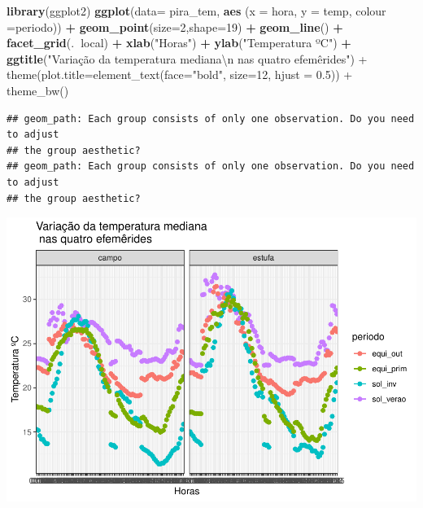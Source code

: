 \documentclass[
]{book}
\newenvironment{Shaded}{\begin{snugshade}}{\end{snugshade}}
\newcommand{\CharTok}[1]{\textcolor[rgb]{0.31,0.60,0.02}{#1}}
\newcommand{\DataTypeTok}[1]{\textcolor[rgb]{0.13,0.29,0.53}{#1}}
\newcommand{\DecValTok}[1]{\textcolor[rgb]{0.00,0.00,0.81}{#1}}
\newcommand{\KeywordTok}[1]{\textcolor[rgb]{0.13,0.29,0.53}{\textbf{#1}}}
\newcommand{\NormalTok}[1]{#1}
\newcommand{\OperatorTok}[1]{\textcolor[rgb]{0.81,0.36,0.00}{\textbf{#1}}}
\newcommand{\StringTok}[1]{\textcolor[rgb]{0.31,0.60,0.02}{#1}}
\begin{document}
\begin{Shaded}
\begin{Highlighting}[]
\KeywordTok{library}\NormalTok{(ggplot2)}
\KeywordTok{ggplot}\NormalTok{(}\DataTypeTok{data=}\NormalTok{ pira_tem, }\KeywordTok{aes}\NormalTok{ (}\DataTypeTok{x =}\NormalTok{ hora, }\DataTypeTok{y =}\NormalTok{ temp, }\DataTypeTok{colour =}\NormalTok{periodo)) }\OperatorTok{+}
\StringTok{  }\KeywordTok{geom_point}\NormalTok{(}\DataTypeTok{size=}\DecValTok{2}\NormalTok{,}\DataTypeTok{shape=}\DecValTok{19}\NormalTok{) }\OperatorTok{+}
\StringTok{  }\KeywordTok{geom_line}\NormalTok{() }\OperatorTok{+}
\StringTok{  }\KeywordTok{facet_grid}\NormalTok{(.}\OperatorTok{~}\NormalTok{local) }\OperatorTok{+}
\StringTok{  }\KeywordTok{xlab}\NormalTok{(}\StringTok{"Horas"}\NormalTok{) }\OperatorTok{+}
\StringTok{  }\KeywordTok{ylab}\NormalTok{(}\StringTok{"Temperatura ºC"}\NormalTok{) }\OperatorTok{+}\StringTok{ }
\StringTok{             }\KeywordTok{ggtitle}\NormalTok{(}\StringTok{"Variação da temperatura mediana}\CharTok{\textbackslash{}n}\StringTok{ nas quatro efemêrides") +}
\StringTok{             theme(plot.title=element_text(face="}\NormalTok{bold}\StringTok{", size=12, hjust = 0.5))  +}
\StringTok{  theme_bw()}
\end{Highlighting}
\end{Shaded}

\begin{verbatim}
## geom_path: Each group consists of only one observation. Do you need to adjust
## the group aesthetic?
## geom_path: Each group consists of only one observation. Do you need to adjust
## the group aesthetic?
\end{verbatim}

\includegraphics{TudodoR_files/figure-latex/unnamed-chunk-245-1.pdf}
\end{document}
